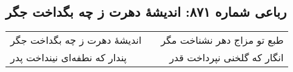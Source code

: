 \begin{center}
\section*{رباعی شماره ۸۷۱: اندیشهٔ دهرت ز چه بگداخت جگر}
\label{sec:0871}
\begin{longtable}{l p{0.5cm} r}
اندیشهٔ دهرت ز چه بگداخت جگر
&&
طبع تو مزاج دهر نشناخت مگر
\\
پندار که نطفه‌ای نینداخت پدر
&&
انگار که گلخنی نپرداخت قدر
\\
\end{longtable}
\end{center}

